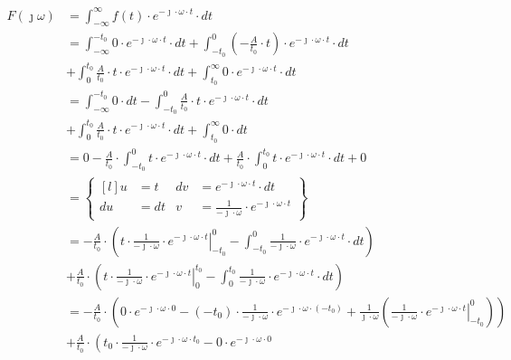 \begin{task}
\begin{align*}
F(\jmath \omega )&=\int_{-\infty }^{\infty}f(t) \cdot e^{-\jmath \cdot \omega \cdot t}\cdot dt\\
&=\int_{-\infty}^{-t_{0}} 0 \cdot e^{-\jmath \cdot \omega \cdot t}\cdot dt %
+\int_{-t_{0}}^{0} \left(-\frac{A}{t_{0}} \cdot t\right) \cdot e^{-\jmath \cdot \omega \cdot t}\cdot dt\\
&+\int_{0}^{t_{0}} \frac{A}{t_{0}} \cdot t \cdot e^{-\jmath \cdot \omega \cdot t}\cdot dt
+\int_{t_{0}}^{\infty} 0 \cdot e^{-\jmath \cdot \omega \cdot t}\cdot dt\\
&=\int_{-\infty}^{-t_{0}} 0 \cdot dt -\int_{-t_{0}}^{0}\frac{A}{t_{0}} \cdot t \cdot e^{-\jmath \cdot \omega \cdot t}\cdot dt \\%
&+\int_{0}^{t_{0}} \frac{A}{t_{0}} \cdot t \cdot e^{-\jmath \cdot \omega \cdot t}\cdot dt 
+ \int_{t_{0}}^{\infty} 0 \cdot dt\\
&= 0  - \frac{A}{t_{0}} \cdot \int_{-t_{0}}^{0} t \cdot e^{-\jmath \cdot \omega \cdot t}\cdot dt +\frac{A}{t_{0}} \cdot \int_{0}^{t_{0}} t \cdot e^{-\jmath \cdot \omega \cdot t}\cdot dt + 0\\%
&=\begin{Bmatrix*}[l] %
u&=t & dv&=e^{ -\jmath \cdot \omega \cdot t} \cdot dt \\
du&=dt & v&=\frac{1}{-\jmath \cdot \omega}\cdot e^{ -\jmath \cdot \omega \cdot t}
\end{Bmatrix*}\\
&=-\frac{A}{t_{0}}\cdot \left( \left. t \cdot \frac{1}{-\jmath \cdot \omega}\cdot e^{ -\jmath \cdot \omega \cdot t} \right|_{-t_{0}}^{0} %
- \int_{-t_{0}}^{0} \frac{1}{-\jmath \cdot \omega}\cdot e^{ -\jmath \cdot \omega \cdot t} \cdot dt \right)\\
&+\frac{A}{t_{0}}\cdot \left( \left. t \cdot \frac{1}{-\jmath \cdot \omega}\cdot e^{ -\jmath \cdot \omega \cdot t} \right|_{0}^{t_{0}}
- \int_{0}^{t_{0}} \frac{1}{-\jmath \cdot \omega}\cdot e^{ -\jmath \cdot \omega \cdot t} \cdot dt \right)\\
&=-\frac{A}{t_{0}}\cdot \left( 0 \cdot e^{-\jmath \cdot \omega \cdot 0} - (-t_{0}) \cdot \frac{1}{-\jmath \cdot \omega}\cdot e^{ -\jmath \cdot \omega \cdot (-t_{0})} %
+ \frac{1}{\jmath \cdot \omega} \left( \left. \frac{1}{-\jmath \cdot \omega}\cdot e^{ -\jmath \cdot \omega \cdot t} \right|_{-t_{0}}^{0}\right)\right)\\
&+\frac{A}{t_{0}}\cdot \left(t_{0} \cdot \frac{1}{-\jmath \cdot \omega}\cdot e^{ -\jmath \cdot \omega \cdot t_{0}} - 0 \cdot e^{-\jmath \cdot \omega \cdot 0} 

\end{align*}
\end{task}
